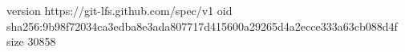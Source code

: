 version https://git-lfs.github.com/spec/v1
oid sha256:9b98f72034ca3edba8e3ada807717d415600a29265d4a2ecce333a63cb088d4f
size 30858
